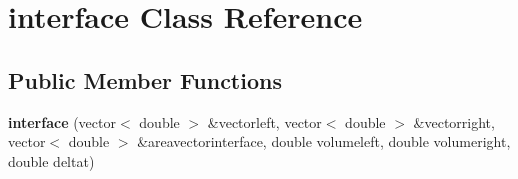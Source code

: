 \hypertarget{classinterface}{}\section{interface Class Reference}
\label{classinterface}
\subsection*{Public Member Functions}
\begin{DoxyCompactItemize}
\item 
{\bfseries interface} (vector$<$ double $>$ \&vectorleft, vector$<$ double $>$ \&vectorright, vector$<$ double $>$ \&areavectorinterface, double volumeleft, double volumeright, double deltat)\hypertarget{classinterface_ac5aa537387995077f128f3125f355297}{}\label{classinterface_ac5aa537387995077f128f3125f355297}

\end{DoxyCompactItemize}
